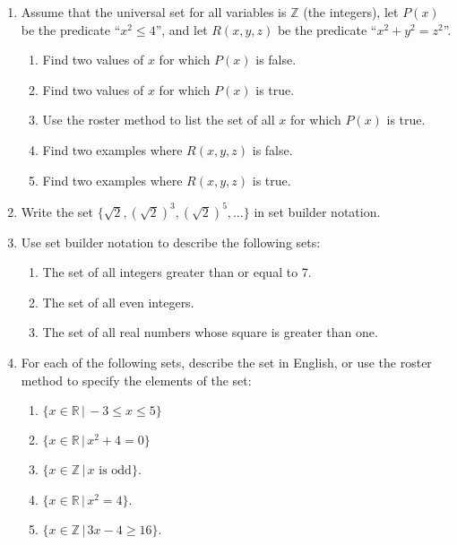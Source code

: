 \documentclass[letterpaper,12pt]{article}
\newcommand{\Z}{\mathbb{Z}}
\newcommand{\R}{\mathbb{R}}
\begin{document}
\begin{enumerate}
 \item Assume that the universal set for all variables is $\Z$ (the integers), let $P(x)$ be the predicate ``$x^2\leq 4$'', and let $R(x,y,z)$ be the predicate ``$x^2+y^2=z^2$''.
\begin{enumerate}
 \item Find two values of $x$ for which $P(x)$ is false.
 \item Find two values of $x$ for which $P(x)$ is true.
 \item Use the roster method to list the set of all $x$ for which $P(x)$ is true.
 \item Find two examples where $R(x,y,z)$ is false.
 \item Find two examples where $R(x,y,z)$ is true.
\end{enumerate}
 \item Write the set $\{\sqrt{2},(\sqrt{2})^3,(\sqrt{2})^5,\ldots\}$ in set builder notation.
 \item Use set builder notation to describe the following sets:
\begin{enumerate}
 \item The set of all integers greater than or equal to 7.
 \item The set of all even integers.
 \item The set of all real numbers whose square is greater than one.
\end{enumerate}
 \item For each of the following sets, describe the set in English, or use the roster method to specify the elements of the set:
\begin{enumerate}
 \item $\{x\in\R\,|\, -3\leq x\leq 5\}$
 \item $\{x\in\R\,|\, x^2+4=0\}$
 \item $\{x\in\Z\,|\, x \text{ is odd}\}$.
 \item $\{x\in\R\,|\, x^2=4\}$.
 \item $\{x\in\Z\,|\, 3x-4\geq 16\}$.
\end{enumerate}

\end{enumerate} 
\end{document}
